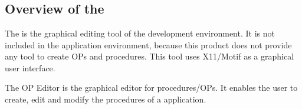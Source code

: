 
\part{\OPE{}}



\chapter*{Overview of the \OPE{}}

The \OPE{} is the graphical editing tool of the \COPRS{} development
environment. It is not included in the \COPRS{} application environment,
because this product does not provide any tool to create OPs and
procedures. This tool uses X11/Motif as a graphical user interface.

The OP Editor is the graphical editor for  procedures/OPs. It enables the
user to create, edit and modify the procedures of a \COPRS{} application.

